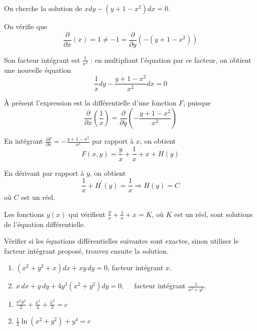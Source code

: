 \documentclass[12pt]{article}
\newcounter{exercice}
\begin{document}
\begin{exercice}
On cherche la solution de $x dy - \left(y+1-x^{2}\right) dx = 0$.
\end{exercice}

\begin{corrige}
On vérifie que
$$
\frac{\partial}{\partial x}(x) = 1 \neq -1 = \frac{\partial}{\partial y}\left(-\left(y+1-x^{2}\right)\right)
$$

Son facteur intégrant est $\frac{1}{x^{2}}$ : en multipliant l'équation par ce facteur, on obtient une nouvelle équation
$$
\frac{1}{x} dy - \frac{y+1-x^{2}}{x^{2}} dx = 0
$$

À présent l'expression est la différentielle d'une fonction $F$, puisque
$$
\frac{\partial}{\partial x}\left(\frac{1}{x}\right) = \frac{\partial}{\partial y}\left(-\frac{y+1-x^{2}}{x^{2}}\right)
$$

En intégrant $\frac{\partial F}{\partial x} = -\frac{y+1-x^{2}}{x^{2}}$ par rapport à $x$, on obtient
$$
F(x, y) = \frac{y}{x}+\frac{1}{x}+x+H(y)
$$

En dérivant par rapport à $y$, on obtient
$$
\frac{1}{x}+H^{\prime}(y) = \frac{1}{x} \Longrightarrow H(y) = C
$$
où $C$ est un réel.

Les fonctions $y(x)$ qui vérifient $\frac{y}{x}+\frac{1}{x}+x=K$, où $K$ est un réel, sont solutions de l'équation différentielle.
\end{corrige}

\begin{exercice}
Vérifier si les équations différentielles suivantes sont exactes, sinon utiliser le facteur intégrant proposé, trouvez ensuite la solution.
\begin{enumerate}
  \item $\left(x^{2}+y^{2}+x\right) dx + xy\, dy = 0$, facteur intégrant $x$.
  \item $x\, dx + y\, dy + 4 y^{3}\left(x^{2}+y^{2}\right) dy = 0, \quad$ facteur intégrant $\frac{1}{x^{2}+y^{2}}$.
\end{enumerate}
\end{exercice}

\begin{corrige}
\begin{enumerate}
  \item $\frac{x^{2} y^{2}}{2}+\frac{x^{4}}{4}+\frac{x^{3}}{3}=c$
  \item $\frac{1}{2} \ln \left(x^{2}+y^{2}\right)+y^{4}=c$
\end{enumerate}
\end{corrige}
\end{document}
